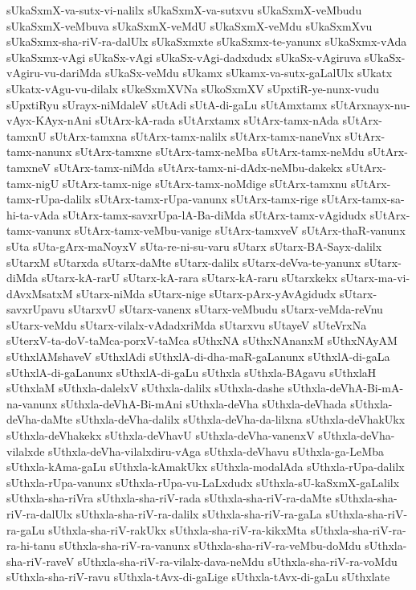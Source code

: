 {sUkaSxmX-va-sutx-vi-nalilx
sUkaSxmX-va-sutxvu
sUkaSxmX-veMbudu
sUkaSxmX-veMbuva
sUkaSxmX-veMdU
sUkaSxmX-veMdu
sUkaSxmXvu
sUkaSxmx-sha-riV-ra-dalUlx
sUkaSxmxte
sUkaSxmx-te-yanunx
sUkaSxmx-vAda
sUkaSxmx-vAgi
sUkaSx-vAgi
sUkaSx-vAgi-dadxdudx
sUkaSx-vAgiruva
sUkaSx-vAgiru-vu-dariMda
sUkaSx-veMdu
sUkamx
sUkamx-va-sutx-gaLalUlx
sUkatx
sUkatx-vAgu-vu-dilalx
sUkeSxmXVNa
sUkoSxmXV
sUpxtiR-ye-nunx-vudu
sUpxtiRyu
sUrayx-niMdaleV
sUtAdi
sUtA-di-gaLu
sUtAmxtamx
sUtArxnayx-nu-vAyx-KAyx-nAni
sUtArx-kA-rada
sUtArxtamx
sUtArx-tamx-nAda
sUtArx-tamxnU
sUtArx-tamxna
sUtArx-tamx-nalilx
sUtArx-tamx-naneVnx
sUtArx-tamx-nanunx
sUtArx-tamxne
sUtArx-tamx-neMba
sUtArx-tamx-neMdu
sUtArx-tamxneV
sUtArx-tamx-niMda
sUtArx-tamx-ni-dAdx-neMbu-dakekx
sUtArx-tamx-nigU
sUtArx-tamx-nige
sUtArx-tamx-noMdige
sUtArx-tamxnu
sUtArx-tamx-rUpa-dalilx
sUtArx-tamx-rUpa-vanunx
sUtArx-tamx-rige
sUtArx-tamx-sa-hi-ta-vAda
sUtArx-tamx-savxrUpa-lA-Ba-diMda
sUtArx-tamx-vAgidudx
sUtArx-tamx-vanunx
sUtArx-tamx-veMbu-vanige
sUtArx-tamxveV
sUtArx-thaR-vanunx
sUta
sUta-gArx-maNoyxV
sUta-re-ni-su-varu
sUtarx
sUtarx-BA-Sayx-dalilx
sUtarxM
sUtarxda
sUtarx-daMte
sUtarx-dalilx
sUtarx-deVva-te-yanunx
sUtarx-diMda
sUtarx-kA-rarU
sUtarx-kA-rara
sUtarx-kA-raru
sUtarxkekx
sUtarx-ma-vi-dAvxMsatxM
sUtarx-niMda
sUtarx-nige
sUtarx-pArx-yAvAgidudx
sUtarx-savxrUpavu
sUtarxvU
sUtarx-vanenx
sUtarx-veMbudu
sUtarx-veMda-reVnu
sUtarx-veMdu
sUtarx-vilalx-vAdadxriMda
sUtarxvu
sUtayeV
sUteVrxNa
sUterxV-ta-doV-taMca-porxV-taMca
sUthxNA
sUthxNAnanxM
sUthxNAyAM
sUthxlAMshaveV
sUthxlAdi
sUthxlA-di-dha-maR-gaLanunx
sUthxlA-di-gaLa
sUthxlA-di-gaLanunx
sUthxlA-di-gaLu
sUthxla
sUthxla-BAgavu
sUthxlaH
sUthxlaM
sUthxla-dalelxV
sUthxla-dalilx
sUthxla-dashe
sUthxla-deVhA-Bi-mA-na-vanunx
sUthxla-deVhA-Bi-mAni
sUthxla-deVha
sUthxla-deVhada
sUthxla-deVha-daMte
sUthxla-deVha-dalilx
sUthxla-deVha-da-lilxna
sUthxla-deVhakUkx
sUthxla-deVhakekx
sUthxla-deVhavU
sUthxla-deVha-vanenxV
sUthxla-deVha-vilalxde
sUthxla-deVha-vilalxdiru-vAga
sUthxla-deVhavu
sUthxla-ga-LeMba
sUthxla-kAma-gaLu
sUthxla-kAmakUkx
sUthxla-modalAda
sUthxla-rUpa-dalilx
sUthxla-rUpa-vanunx
sUthxla-rUpa-vu-LaLxdudx
sUthxla-sU-kaSxmX-gaLalilx
sUthxla-sha-riVra
sUthxla-sha-riV-rada
sUthxla-sha-riV-ra-daMte
sUthxla-sha-riV-ra-dalUlx
sUthxla-sha-riV-ra-dalilx
sUthxla-sha-riV-ra-gaLa
sUthxla-sha-riV-ra-gaLu
sUthxla-sha-riV-rakUkx
sUthxla-sha-riV-ra-kikxMta
sUthxla-sha-riV-ra-ra-hi-tanu
sUthxla-sha-riV-ra-vanunx
sUthxla-sha-riV-ra-veMbu-doMdu
sUthxla-sha-riV-raveV
sUthxla-sha-riV-ra-vilalx-dava-neMdu
sUthxla-sha-riV-ra-voMdu
sUthxla-sha-riV-ravu
sUthxla-tAvx-di-gaLige
sUthxla-tAvx-di-gaLu
sUthxlate
}
